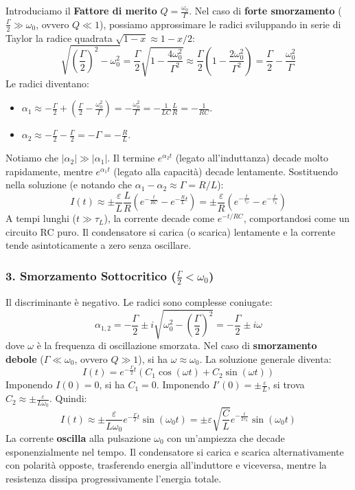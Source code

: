 \documentclass{book}
\begin{document}
Introduciamo il \textbf{Fattore di merito} $Q = \frac{\omega_0}{\Gamma}$.
Nel caso di \textbf{forte smorzamento} ($\frac{\Gamma}{2} \gg \omega_0$, ovvero $Q \ll 1$), possiamo approssimare le radici sviluppando in serie di Taylor la radice quadrata $\sqrt{1-x} \approx 1 - x/2$:
$$
\sqrt{\left(\frac{\Gamma}{2}\right)^2 - \omega_0^2} = \frac{\Gamma}{2} \sqrt{1 - \frac{4\omega_0^2}{\Gamma^2}} \approx \frac{\Gamma}{2} \left( 1 - \frac{2\omega_0^2}{\Gamma^2} \right) = \frac{\Gamma}{2} - \frac{\omega_0^2}{\Gamma}
$$
Le radici diventano:
\begin{itemize}
    \item $\alpha_1 \approx -\frac{\Gamma}{2} + \left(\frac{\Gamma}{2} - \frac{\omega_0^2}{\Gamma}\right) = -\frac{\omega_0^2}{\Gamma} = -\frac{1}{LC}\frac{L}{R} = -\frac{1}{RC}$.
    \item $\alpha_2 \approx -\frac{\Gamma}{2} - \frac{\Gamma}{2} = -\Gamma = -\frac{R}{L}$.
\end{itemize}
Notiamo che $|\alpha_2| \gg |\alpha_1|$. Il termine $e^{\alpha_2 t}$ (legato all'induttanza) decade molto rapidamente, mentre $e^{\alpha_1 t}$ (legato alla capacità) decade lentamente.
Sostituendo nella soluzione (e notando che $\alpha_1 - \alpha_2 \approx \Gamma = R/L$):
$$
I(t) \approx \pm \frac{\varepsilon}{L} \frac{L}{R} \left( e^{-\frac{t}{RC}} - e^{-\frac{R}{L}t} \right) = \pm \frac{\varepsilon}{R} \left( e^{-\frac{t}{\tau_C}} - e^{-\frac{t}{\tau_L}} \right)
$$
A tempi lunghi ($t \gg \tau_L$), la corrente decade come $e^{-t/RC}$, comportandosi come un circuito RC puro. Il condensatore si carica (o scarica) lentamente e la corrente tende asintoticamente a zero senza oscillare.

\subsubsection{3. Smorzamento Sottocritico ($\frac{\Gamma}{2} < \omega_0$)}
Il discriminante è negativo. Le radici sono complesse coniugate:
$$
\alpha_{1,2} = -\frac{\Gamma}{2} \pm i \sqrt{\omega_0^2 - \left(\frac{\Gamma}{2}\right)^2} = -\frac{\Gamma}{2} \pm i \omega
$$
dove $\omega$ è la frequenza di oscillazione smorzata. Nel caso di \textbf{smorzamento debole} ($\Gamma \ll \omega_0$, ovvero $Q \gg 1$), si ha $\omega \approx \omega_0$.
La soluzione generale diventa:
$$
I(t) = e^{-\frac{\Gamma}{2}t} (C_1 \cos(\omega t) + C_2 \sin(\omega t))
$$
Imponendo $I(0)=0$, si ha $C_1 = 0$.
Imponendo $I'(0) = \pm \frac{\varepsilon}{L}$, si trova $C_2 \approx \pm \frac{\varepsilon}{L\omega_0}$.
Quindi:
$$
I(t) \approx \pm \frac{\varepsilon}{L \omega_0} e^{-\frac{\Gamma}{2}t} \sin(\omega_0 t) = \pm \varepsilon \sqrt{\frac{C}{L}} e^{-\frac{t}{2\tau_L}} \sin(\omega_0 t)
$$
La corrente \textbf{oscilla} alla pulsazione $\omega_0$ con un'ampiezza che decade esponenzialmente nel tempo. Il condensatore si carica e scarica alternativamente con polarità opposte, trasferendo energia all'induttore e viceversa, mentre la resistenza dissipa progressivamente l'energia totale.
\end{document}
